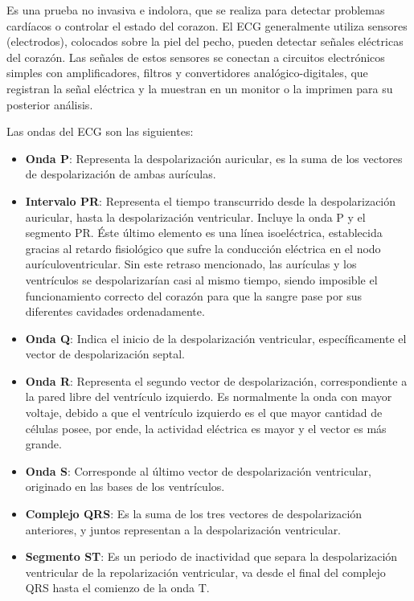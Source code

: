     Es una prueba no invasiva e indolora, que se realiza para detectar problemas cardíacos o controlar el estado del corazon. El ECG generalmente utiliza sensores (electrodos), colocados sobre la piel del pecho, pueden detectar señales eléctricas del corazón. Las señales de estos sensores se conectan a circuitos electrónicos simples con amplificadores, filtros y convertidores analógico-digitales, que registran la señal eléctrica y la muestran en un monitor o la imprimen para su posterior análisis.

    Las ondas del ECG son las siguientes:

    \begin{itemize}
        \item \textbf{Onda P}: Representa la despolarización auricular, es la suma de los vectores de despolarización de ambas aurículas.
        \item \textbf{Intervalo PR}: Representa el tiempo transcurrido desde la despolarización auricular, hasta la despolarización ventricular. Incluye la onda P y el segmento PR. Éste último elemento es una línea isoeléctrica, establecida gracias al retardo fisiológico que sufre la conducción eléctrica en el nodo aurículoventricular. Sin este retraso mencionado, las aurículas y los ventrículos se despolarizarían casi al mismo tiempo, siendo imposible el funcionamiento correcto del corazón para que la sangre pase por sus diferentes cavidades ordenadamente.
        \item \textbf{Onda Q}: Indica el inicio de la despolarización ventricular, específicamente el vector de despolarización septal.
        \item \textbf{Onda R}: Representa el segundo vector de despolarización, correspondiente a la pared libre del ventrículo izquierdo. Es normalmente la onda con mayor voltaje, debido a que el ventrículo izquierdo es el que mayor cantidad de células posee, por ende, la actividad eléctrica es mayor y el vector es más grande.
        \item \textbf{Onda S}: Corresponde al último vector de despolarización ventricular, originado en las bases de los ventrículos.
        \item \textbf{Complejo QRS}: Es la suma de los tres vectores de despolarización anteriores, y juntos representan a la despolarización ventricular.
        \item \textbf{Segmento ST}: Es un periodo de inactividad que separa la despolarización ventricular de la repolarización ventricular, va desde el final del complejo QRS hasta el comienzo de la onda T. 

\end{itemize}
